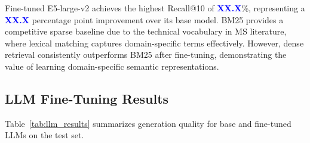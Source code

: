 \documentclass[11pt]{article}
\newcommand{\placeholder}[1]{\textcolor{blue}{\textbf{#1}}}
\begin{document}
Fine-tuned E5-large-v2 achieves the highest Recall@10 of \placeholder{XX.X}\%, representing a \placeholder{XX.X} percentage point improvement over its base model. BM25 provides a competitive sparse baseline due to the technical vocabulary in MS literature, where lexical matching captures domain-specific terms effectively. However, dense retrieval consistently outperforms BM25 after fine-tuning, demonstrating the value of learning domain-specific semantic representations.

\subsection{LLM Fine-Tuning Results}
\label{sec:llm_results}

Table~\ref{tab:llm_results} summarizes generation quality for base and fine-tuned LLMs on the test set.
\end{document}
